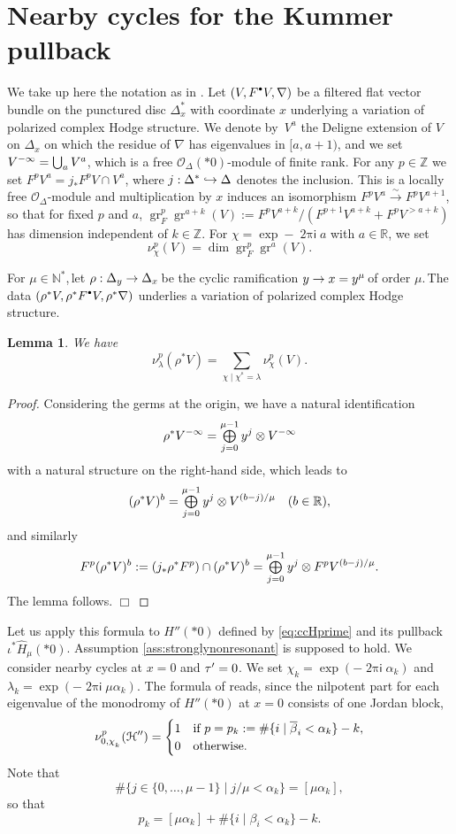 \documentclass[11pt]{article}
\let\mathcal\mathscr
\newtheorem{lemme}{Lemma}
\def\cO{\mathcal{O}}
\def\NN{\mathbb{N}}
\def\RR{\mathbb{R}}
\def\ZZ{\mathbb{Z}}
\def\ccH{\EuScript{H}}
\newcommand{\bbullet}{{\scriptscriptstyle\bullet}}
\newcommand{\cbbullet}{{\raisebox{1pt}{$\bbullet$}}}
\newcommand{\isom}{\stackrel{\sim}{\longrightarrow}}
\let\wh\widehat
\let\ov\overline
\newcommand{\sfi}{\mathsf{i}}
\DeclareMathOperator{\twopii}{2\pi\sfi}
\DeclareMathOperator{\gr}{gr}
\def\to{\mathchoice{\longrightarrow}{\rightarrow}{\rightarrow}{\rightarrow}}
\def\hto{\mathrel{\lhook\joinrel\to}}
\let\oldbigoplus\bigoplus
\renewcommand{\bigoplus}{\mathop{\textstyle\oldbigoplus}\displaylimits}
\let\oldbigcup\bigcup
\renewcommand{\bigcup}{\mathop{\textstyle\oldbigcup}\displaylimits}
\begin{document}
\section{Nearby cycles for the Kummer pullback}\label{subsec:nearby}
We take up here the notation as in \cite{D-S12}. Let $(V,F^\cbbullet V,\nabla)$ be a filtered flat vector bundle on the punctured disc $\Delta_x^*$ with coordinate $x$ underlying a variation of polarized complex Hodge structure. We denote by~$V^a$ the Deligne extension of $V$ on $\Delta_x$ on which the residue of $\nabla$ has eigenvalues in $[a,a+1)$, and we set $V^{-\infty}=\bigcup_aV^a$, which is a free $\cO_\Delta(*0)$-module of finite rank. For any $p\in\ZZ$ we set $F^pV^a=j_*F^pV\cap V^a$, where $j:\Delta^*\hto\Delta$ denotes the inclusion. This is a locally free $\cO_\Delta$-module and multiplication by $x$ induces an isomorphism $F^pV^a\isom F^pV^{a+1}$, so that for fixed $p$ and $a$, $\gr^p_F\gr^{a+k}(V):=F^pV^{a+k}/(F^{p+1}V^{a+k}+F^pV^{>a+k})$ has dimension independent of $k\in\ZZ$. For $\chi=\exp-\twopii a$ with $a\in\RR$, we set
\[
\nu_\chi^p(V)=\dim\gr^p_F\gr^a(V).
\]

For $\mu\in\NN^*$,\,let $\rho:\Delta_y\to\Delta_x$\,be the cyclic ramification $y\to x=y^\mu$\,of order $\mu$.\,The data $(\rho^*V,\rho^*F^\cbbullet V,\rho^*\nabla)$ underlies a variation of polarized complex Hodge structure.

\begin{lemme}\label{lem:KummerHodge}
We have
\[
\nu_\lambda^p(\rho^*V)=\sum_{\chi\mid\chi^{^\mu}=\lambda}\nu_\chi^p(V).
\]
\end{lemme}

\begin{proof}
Considering the germs at the origin, we have a natural identification
\[
\rho^*V^{-\infty}=\bigoplus_{j=0}^{\mu-1}y^j\otimes V^{-\infty}
\]
with a natural structure on the right-hand side, which leads to
\[
(\rho^*V)^b=\bigoplus_{j=0}^{\mu-1}y^j\otimes V^{(b-j)/\mu}\quad(b\in\RR),
\]
and similarly
\[
F^p(\rho^*V)^b:=(j_*\rho^*F^p)\cap(\rho^*V)^b=\bigoplus_{j=0}^{\mu-1}y^j\otimes F^pV^{(b-j)/\mu}.
\]
The lemma follows.
\hfill $\Box$
\end{proof}

Let us apply this formula to $H''(*0)$ defined by \eqref{eq:ccHprime} and its pullback $\iota^*\wh H_\mu(*0)$. Assump\-tion \ref{ass:stronglynonresonant} is supposed to hold. We consider nearby cycles at $x=0$ and $\tau'=\nobreak0$. We set $\chi_k=\exp(-\twopii\alpha_k)$ and $\lambda_k=\exp(-\twopii\mu\alpha_k)$. The formula of \cite[Th.\,3(b)]{Fedorov15} reads, since the nilpotent part for each eigenvalue of the monodromy of $H''(*0)$ at $x=0$ consists of one Jordan block,
\[
\nu_{0,\chi_{_k}}^p(\ccH'')=
\begin{cases}
1&\text{if }p=p_k:=\#\{i\mid\ov\beta_i<\alpha_k\}-k,\\
0&\text{otherwise}.
\end{cases}
\]
Note that
\[
\#\{j\in\{0,\dots,\mu-1\}\mid j/\mu<\alpha_k\}=[\mu\alpha_k],
\]
so that
\[
p_k=[\mu\alpha_k]+\#\{i\mid\beta_i<\alpha_k\}-k.
\]
\end{document}
